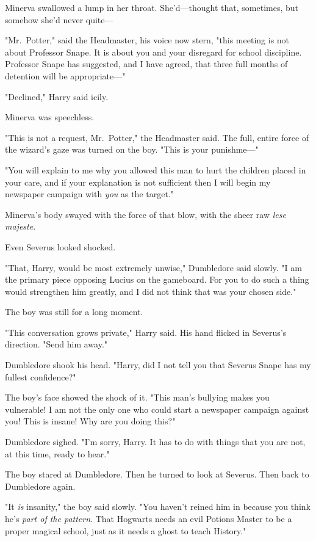 Minerva swallowed a lump in her throat. She'd---thought that, sometimes, but
somehow she'd never quite\mbox{---}

"Mr.~Potter," said the Headmaster, his voice now stern, "this meeting is not
about Professor Snape. It is about you and your disregard for school
discipline. Professor Snape has suggested, and I have agreed, that three full
months of detention will be appropriate\mbox{---}"

"Declined," Harry said icily.

Minerva was speechless.

"This is not a request, Mr.~Potter," the Headmaster said. The full, entire
force of the wizard's gaze was turned on the boy. "This is your punishme\mbox{---}"

"You will explain to me why you allowed this man to hurt the children placed in
your care, and if your explanation is not sufficient then I will begin my
newspaper campaign with \emph{you} as the target."

Minerva's body swayed with the force of that blow, with the sheer raw
\emph{lese majeste}.

Even Severus looked shocked.

"That, Harry, would be most extremely unwise," Dumbledore said slowly. "I am
the primary piece opposing Lucius on the gameboard. For you to do such a thing
would strengthen him greatly, and I did not think that was your chosen side."

The boy was still for a long moment.

"This conversation grows private," Harry said. His hand flicked in Severus's
direction. "Send him away."

Dumbledore shook his head. "Harry, did I not tell you that Severus Snape has my
fullest confidence?"

The boy's face showed the shock of it. "This man's bullying makes you
vulnerable! I am not the only one who could start a newspaper campaign against
you! This is insane! Why are you doing this?"

Dumbledore sighed. "I'm sorry, Harry. It has to do with things that you are
not, at this time, ready to hear."

The boy stared at Dumbledore. Then he turned to look at Severus. Then back to
Dumbledore again.

"It \emph{is} insanity," the boy said slowly. "You haven't reined him in
because you think he's \emph{part of the pattern}. That Hogwarts needs an evil
Potions Master to be a proper magical school, just as it needs a ghost to teach
History."

